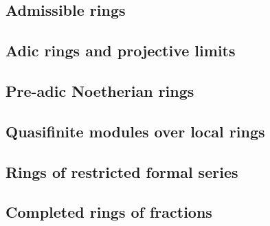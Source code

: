 \documentclass{book}
\begin{document}
    \label{0-prelim-7}



        \subsection{Admissible rings}

        \label{0-prelim-7.1}

        



        \subsection{Adic rings and projective limits}

        \label{0-prelim-7.2}

        



        \subsection{Pre-adic Noetherian rings}

        \label{0-prelim-7.3}

        



        \subsection{Quasifinite modules over local rings}

        \label{0-prelim-7.4}

        



        \subsection{Rings of restricted formal series}

        \label{0-prelim-7.5}

        



        \subsection{Completed rings of fractions}
\end{document}
